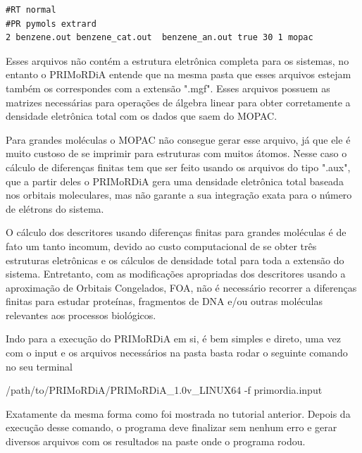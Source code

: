 \documentclass[a4paper,11pt]{refart}
\begin{document}
\hspace*{-\leftmarginwidth}
\begin{minipage}{\fullwidth}
\begin{lstlisting}[caption={Input editado para execução do tutorial 2},label={tut201}]
#RT normal
#PR pymols extrard
2 benzene.out benzene_cat.out  benzene_an.out true 30 1 mopac
\end{lstlisting}
\end{minipage}

Esses arquivos não contém a estrutura eletrônica completa para os sistemas, no entanto o PRIMoRDiA entende que na mesma pasta que esses arquivos estejam também os correspondes com a extensão ".mgf". Esses arquivos possuem as matrizes necessárias para operações de álgebra linear para obter corretamente a densidade eletrônica total com os dados que saem do MOPAC. 

Para grandes moléculas o MOPAC não consegue gerar esse arquivo, já que ele é muito custoso de se imprimir para estruturas com muitos átomos. Nesse caso o cálculo de diferenças finitas tem que ser feito usando os arquivos do tipo ".aux", que a partir deles o PRIMoRDiA gera uma densidade eletrônica total baseada nos orbitais moleculares, mas não garante a sua integração exata para o número de elétrons do sistema. 

O cálculo dos descritores usando diferenças finitas para grandes moléculas é de fato um tanto incomum, devido ao custo computacional de se obter três estruturas eletrônicas e os cálculos de densidade total para toda a extensão do sistema. Entretanto, com as modificações apropriadas dos descritores usando a aproximação de Orbitais Congelados, FOA, não é necessário recorrer a diferenças finitas para estudar proteínas, fragmentos de DNA e/ou outras moléculas relevantes aos processos biológicos.  

Indo para a execução do PRIMoRDiA em si, é bem simples e direto, uma vez com o input e os arquivos necessários na pasta basta rodar o seguinte comando no seu terminal


\hspace*{-\leftmarginwidth}
\begin{minipage}{\fullwidth}
	\begin{commandshell}/path/to/PRIMoRDiA/PRIMoRDiA_1.0v_LINUX64 -f primordia.input\end{commandshell}
\end{minipage}

Exatamente da mesma forma como foi mostrada no tutorial anterior. Depois da execução desse comando, o programa deve finalizar sem nenhum erro e gerar diversos arquivos com os resultados na paste onde o programa rodou. 
\end{document}
